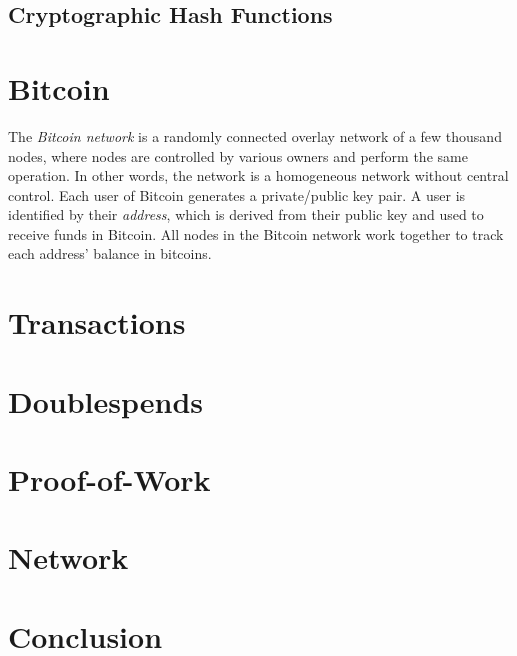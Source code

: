 \documentclass{article}
\begin{document}
\subsection{Cryptographic Hash Functions}

\section{Bitcoin}

The \emph{Bitcoin network} is a randomly connected overlay network of a few
thousand nodes, where nodes are controlled by various owners and perform the
same operation. In other words, the network is a homogeneous network without
central control. Each user of Bitcoin generates a private/public key pair. A
user is identified by their \emph{address}, which is derived from their public
key and used to receive funds in Bitcoin. All nodes in the Bitcoin network work
together to track each address' balance in bitcoins.

\section{Transactions}

\section{Doublespends}

\section{Proof-of-Work}

\section{Network}

\section{Conclusion}
\end{document}
